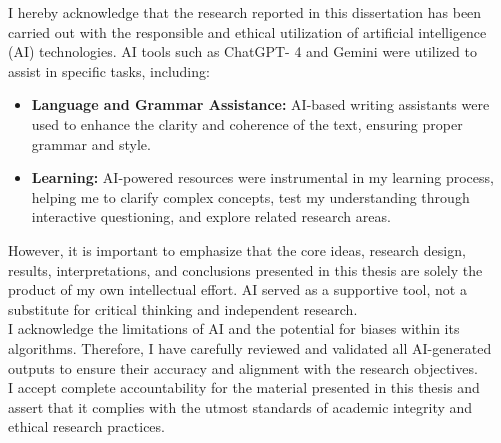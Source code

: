 I hereby acknowledge that the research reported in this dissertation has been carried out with the responsible and ethical utilization of artificial intelligence (AI) technologies. AI tools such as ChatGPT- 4 and Gemini were utilized to assist in specific tasks, including:


\begin{itemize}
	\item \textbf{Language and Grammar Assistance:} AI-based writing assistants were used to enhance the clarity and coherence of the text, ensuring proper grammar and style.
	\item \textbf{Learning:} AI-powered resources were instrumental in my learning process, helping me to clarify complex concepts, test my understanding through interactive questioning, and explore related research areas.
\end{itemize}


\noindent However, it is important to emphasize that the core ideas, research design, results, interpretations, and conclusions presented in this thesis are solely the product of my own intellectual effort. AI served as a supportive tool, not a substitute for critical thinking and independent research.\\

\noindent I acknowledge the limitations of AI and the potential for biases within its algorithms. Therefore, I have carefully reviewed and validated all AI-generated outputs to ensure their accuracy and alignment with the research objectives.\\

\noindent I accept complete accountability for the material presented in this thesis and assert that it complies with the utmost standards of academic integrity and ethical research practices.
